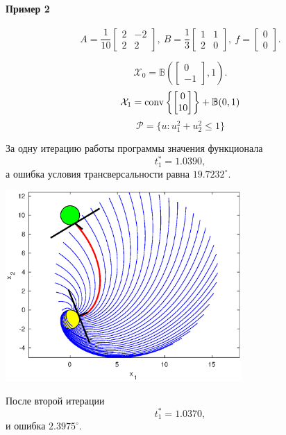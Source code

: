 \documentclass[11pt]{article}
\newcommand\PS{\mathcal{P}}
\newcommand\X{\mathcal{X}}
\newcommand\Cl[2]{\begin{bmatrix}
#1 \\ #2
\end{bmatrix}}
\newcommand\Conv[1]{{\rm conv}\left\{ #1 \right\}}
\begin{document}
\newpage
\paragraph{Пример 2\\}
\begin{equation}
A = \frac1{10}\begin{bmatrix}
2 & -2 \\ 2 & 2
\end{bmatrix},\ 
B = \frac13\begin{bmatrix}
1 & 1 \\ 2 & 0
\end{bmatrix}, \
f = \begin{bmatrix}
0 \\ 0
\end{bmatrix}.
\end{equation}

$$\X_0 = \mathbb{B}\left(\Cl{0}{-1}, 1\right).$$
$$\X_1 = \Conv{\Cl{0}{10}} + \mathbb{B}(0, 1)$$
$$\PS = \{u\colon u_1^2 + u_2^2 \le 1\}$$


За одну итерацию работы программы значения функционала 
$$t_1^* = 1.0390,$$
а ошибка условия трансверсальности равна $19.7232^\circ$.

\begin{center}
\includegraphics[width=90mm]{2xx_it1.eps}
\end{center}

После второй итерации
$$ t_1^* = 1.0370, $$
и ошибка $2.3975^\circ$.
\end{document}
